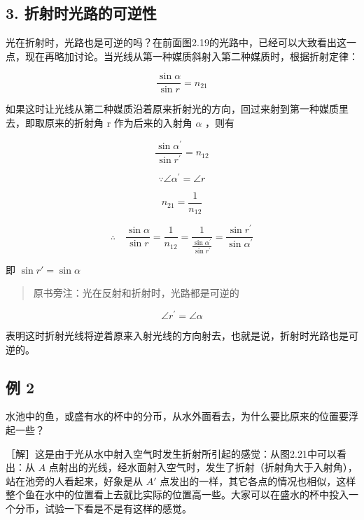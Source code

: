 \subsection{3.
折射时光路的可逆性}

光在折射时，光路也是可逆的吗？在前面图2.19的光路中，已经可以大致看出这一点，现在再略加讨论。当光线从第一种媒质斜射入第二种媒质时，根据折射定律：

\[
\frac {\sin \alpha}{\sin r} = n _ {21}
\]

如果这时让光线从第二种媒质沿着原来折射光的方向，回过来射到第一种媒质里去，即取原来的折射角
r 作为后来的入射角 \(\alpha\) ，则有

\[
\frac {\sin \alpha^ {\prime}}{\sin r ^ {\prime}} = n _ {12}
\]

\[
\because \angle \alpha^ {\prime} = \angle r
\]

\[
n _ {21} = \frac {1}{n _ {12}}
\]

\[
\therefore \quad \frac {\sin \alpha}{\sin r} = \frac {1}{n _ {12}} = \frac {1}{\frac {\sin \alpha^ {\prime}}{\sin r ^ {\prime}}} = \frac {\sin r ^ {\prime}}{\sin \alpha^ {\prime}}
\]

即 \(\sin r' = \sin \alpha\)

\begin{quote}
原书旁注：光在反射和折射时，光路都是可逆的
\end{quote}

\[
\angle r ^ {\prime} = \angle \alpha
\]

表明这时折射光线将逆着原来入射光线的方向射去，也就是说，折射时光路也是可逆的。

\subsection{例 2}

水池中的鱼，或盛有水的杯中的分币，从水外面看去，为什么要比原来的位置要浮起一些？

［解］这是由于光从水中射入空气时发生折射所引起的感觉：从图2.21中可以看出：从
\(A\)
点射出的光线，经水面射入空气时，发生了折射（折射角大于入射角），站在池旁的人看起来，好象是从
\(A'\)
点发出的一样，其它各点的情况也相似，这样整个鱼在水中的位置看上去就比实际的位置高一些。大家可以在盛水的杯中投入一个分币，试验一下看是不是有这样的感觉。

